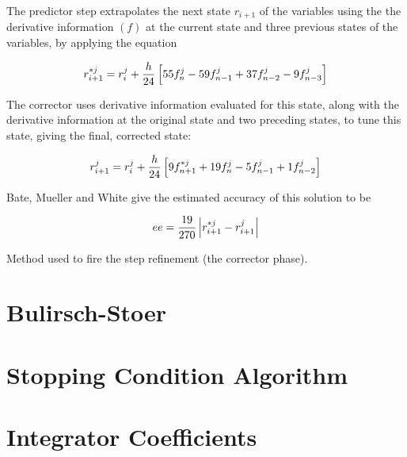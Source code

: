 The predictor step extrapolates the next state $r_{i+1}$ of the
variables using the the derivative information $(f)$ at the
current state and three  previous states of the variables, by
applying the equation

\[ r_{i+1}^{*j} = r_i^j + {{h}\over{24}}\left[55 f_n^j - 59 f_{n-1}^j + 37 f_{n-2}^j - 9 f_{n-3}^j \right] \]

The corrector uses derivative information evaluated for this
state, along  with the derivative information at the original
state and two preceding  states, to tune this state, giving the
final, corrected state:

\[ r_{i+1}^{j} = r_i^j + {{h}\over{24}}\left[9 f_{n+1}^{*j} + 19 f_{n}^j - 5 f_{n-1}^j + 1 f_{n-2}^j \right] \]

Bate, Mueller and White give the estimated accuracy of this
solution to be

\[ee = {{19}\over{270}} \left|r_{i+1}^{*j} - r_{i+1}^{j}\right|\]

Method used to fire the step refinement (the corrector phase).

\section{Bulirsch-Stoer} 

\section{Stopping Condition Algorithm} 

\section{Integrator Coefficients} 






